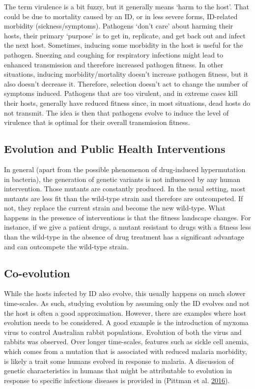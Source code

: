 \documentclass[]{article}
\theoremstyle{definition}
\theoremstyle{definition}
\theoremstyle{definition}
\theoremstyle{remark}
\begin{document}
The term virulence is a bit fuzzy, but it generally means `harm to the
host'. That could be due to mortality caused by an ID, or in less severe
forms, ID-related morbidity (sickness/symptoms). Pathogens `don't care'
about harming their hosts, their primary `purpose' is to get in,
replicate, and get back out and infect the next host. Sometimes,
inducing some morbidity in the host is useful for the pathogen. Sneezing
and coughing for respiratory infections might lead to enhanced
transmission and therefore increased pathogen fitness. In other
situations, inducing morbidity/mortality doesn't increase pathogen
fitness, but it also doesn't decrease it. Therefore, selection doesn't
act to change the number of symptoms induced. Pathogens that are too
virulent, and in extreme cases kill their hosts, generally have reduced
fitness since, in most situations, dead hosts do not transmit. The idea
is then that pathogens evolve to induce the level of virulence that is
optimal for their overall transmission fitness.

\subsection{Evolution and Public Health
Interventions}\label{evolution-and-public-health-interventions}

In general (apart from the possible phenomenon of drug-induced
hypermutation in bacteria), the generation of genetic variants is not
influenced by any human intervention. Those mutants are constantly
produced. In the usual setting, most mutants are less fit than the
wild-type strain and therefore are outcompeted. If not, they replace the
current strain and become the new wild-type. What happens in the
presence of interventions is that the fitness landscape changes. For
instance, if we give a patient drugs, a mutant resistant to drugs with a
fitness less than the wild-type in the absence of drug treatment has a
significant advantage and can outcompete the wild-type strain.

\subsection{Co-evolution}\label{co-evolution}

While the hosts infected by ID also evolve, this usually happens on much
slower time-scales. As such, studying evolution by assuming only the ID
evolves and not the host is often a good approximation. However, there
are examples where host evolution needs to be considered. A good example
is the introduction of myxoma virus to control Australian rabbit
populations. Evolution of both the virus and rabbits was observed. Over
longer time-scales, features such as sickle cell anemia, which comes
from a mutation that is associated with reduced malaria morbidity, is
likely a trait some humans evolved in response to malaria. A discussion
of genetic characteristics in humans that might be attributable to
evolution in response to specific infectious diseases is provided in
(Pittman et al. \protect\hyperlink{ref-pittman16}{2016}).
\end{document}
